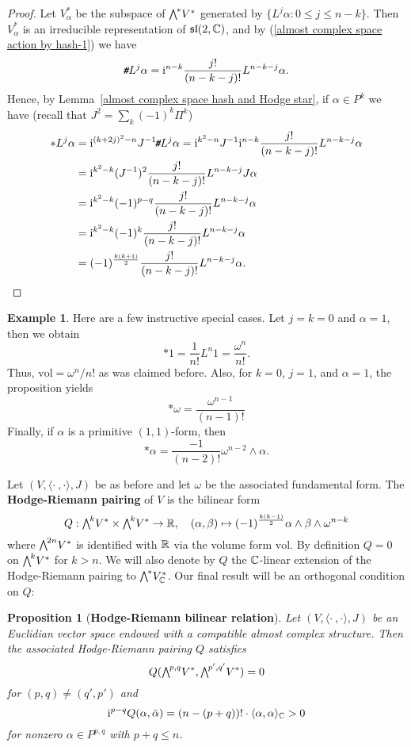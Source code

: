 \documentclass[11pt]{book}
\newtheorem{proposition}[theorem]{Proposition}
\theoremstyle{definition}
\newtheorem{example}[theorem]{Example}
\begin{document}
\begin{proof}
Let $V^*_\alpha$ be the subspace of $\bigw^*V^*$ generated by $\{L^j\alpha:0\leq j\leq n-k\}$. Then $V^*_\alpha$ is an irreducible representation of $\mathfrak{sl}(2,\mathbb{C})$, and by (\ref{almost complex space action by hash-1}) we have
\[\!\textit{\texttt{\#}} L^j\alpha=\mathrm{i}^{n-k}\frac{j!}{(n-k-j)!}L^{n-k-j}\alpha.\]
Hence, by Lemma~\ref{almost complex space hash and Hodge star}, if $\alpha\in P^k$ we have (recall that $J^2=\sum_k(-1)^k\Pi^k$)
\begin{align*}
\ast L^j\alpha&=\mathrm{i}^{(k+2j)^2-n}J^{-1}\!\textit{\texttt{\#}} L^j\alpha=\mathrm{i}^{k^2-n}J^{-1}\mathrm{i}^{n-k}\frac{j!}{(n-k-j)!}L^{n-k-j}\alpha\\
&=\mathrm{i}^{k^2-k}(J^{-1})^2\frac{j!}{(n-k-j)!}L^{n-k-j}J\alpha\\
&=\mathrm{i}^{k^2-k}(-1)^{p-q}\frac{j!}{(n-k-j)!}L^{n-k-j}\alpha\\
&=\mathrm{i}^{k^2-k}(-1)^{k}\frac{j!}{(n-k-j)!}L^{n-k-j}\alpha\\
&=(-1)^{\frac{k(k+1)}{2}}\frac{j!}{(n-k-j)!}L^{n-k-j}\alpha.\qedhere
\end{align*}
\end{proof}
\begin{example}
Here are a few instructive special cases. Let $j=k=0$ and $\alpha=1$, then we obtain 
\[\ast 1=\frac{1}{n!}L^n1=\frac{\omega^n}{n!}.\]
Thus, $\mathrm{vol}=\omega^n/n!$ as was claimed before. Also, for $k=0$, $j=1$, and $\alpha=1$, the proposition yields 
\[\ast\omega=\frac{\omega^{n-1}}{(n-1)!}\]
Finally, if $\alpha$ is a primitive $(1,1)$-form, then
\[\ast\alpha=\frac{-1}{(n-2)!}\omega^{n-2}\wedge\alpha.\]
\end{example}
Let $(V,\langle\cdot\ ,\cdot\rangle,J)$ be as before and let $\omega$ be the associated fundamental form. The \textbf{Hodge-Riemann pairing} of $V$ is the bilinear form
\[Q:\bigw^kV^*\times\bigw^kV^*\to\R,\quad (\alpha,\beta)\mapsto(-1)^{\frac{k(k-1)}{2}}\alpha\wedge\beta\wedge\omega^{n-k}\]
where $\bigw^{2n}V^*$ is identified with $\mathbb{R}$ via the volume form $\mathrm{vol}$. By definition $Q=0$ on $\bigw^kV^*$ for $k>n$. We will also denote by $Q$ the $\mathbb{C}$-linear extension of the Hodge-Riemann pairing to $\bigw^*V^*_{\C}$. Our final result will be an orthogonal condition on $Q$:
\begin{proposition}[\textbf{Hodge-Riemann bilinear relation}]\label{almost complex space Hodge-Riemann bilinear relation}
Let $(V,\langle\cdot\ ,\cdot\rangle,J)$ be an Euclidian vector space endowed with a compatible almost complex structure. Then the associated Hodge-Riemann pairing $Q$ satisfies
\[Q(\bigw^{p,q}V^*,\bigw^{p',q'}V^*)=0\]
for $(p,q)\neq(q',p')$ and
\[\mathrm{i}^{p-q}Q(\alpha,\bar{\alpha})=(n-(p+q))!\cdot\langle\alpha,\alpha\rangle_{\mathbb{C}}>0\]
for nonzero $\alpha\in P^{p,q}$ with $p+q\leq n$.
\end{proposition}
\end{document}
